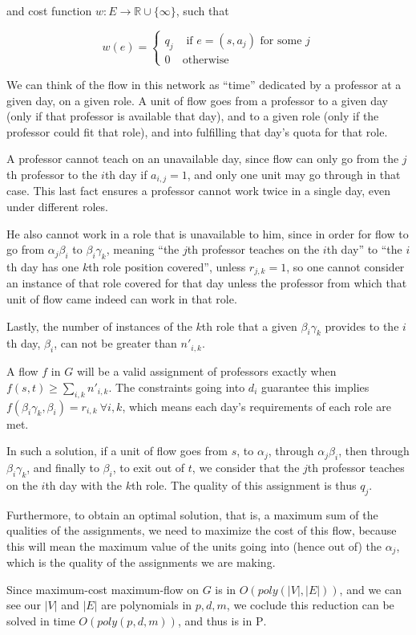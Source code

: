 and cost function $w:E \to \mathbb{R} \cup \{\infty\}$, such that 

$$
w(e) =
\begin{cases}
q_j &\text{ if } e = (s, a_j) \text{ for some }j\\
0 & \text{otherwise}
\end{cases}
$$

We can think of the flow in this network as ``time'' dedicated by a professor at a given day, on a given role. A unit of flow goes from a professor to a given day (only if that professor is available that day), and to a given role (only if the professor could fit that role), and into fulfilling that day's quota for that role.

A professor cannot teach on an unavailable day, since flow can only go from the $j$th professor to the $i$th day if $a_{i, j} = 1$, and only one unit may go through in that case. This last fact ensures a professor cannot work twice in a single day, even under different roles.

He also cannot work in a role that is unavailable to him, since in order for flow to go from $\alpha_j \beta_i$ to $\beta_i \gamma_k$, meaning ``the $j$th professor teaches on the $i$th day'' to ``the $i$th day has one $k$th role position covered'', unless $r_{j, k} = 1$, so one cannot consider an instance of that role covered for that day unless the professor from which that unit of flow came indeed can work in that role.

Lastly, the number of instances of the $k$th role that a given $\beta_i \gamma_k$ provides to the $i$th day, $\beta_i$, can not be greater than $n'_{i, k}$.

A flow $f$ in $G$ will be a valid assignment of professors exactly when $f(s, t) \ge \sum_{i, k} n'_{i, k}$. The constraints going into $d_i$ guarantee this implies $f(\beta_i \gamma_k, \beta_i) = r_{i, k}\ \forall i, k$, which means each day's requirements of each role are met.

In such a solution, if a unit of flow goes from $s$, to $\alpha_j$, through $\alpha_j \beta_i$, then through $\beta_i \gamma_k$, and finally to $\beta_i$, to exit out of $t$, we consider that the $j$th professor teaches on the $i$th day with the $k$th role. The quality of this assignment is thus $q_j$.

Furthermore, to obtain an optimal solution, that is, a maximum sum of the qualities of the assignments, we need to maximize the cost of this flow, because this will mean the maximum value of the units going into (hence out of) the $\alpha_j$, which is the quality of the assignments we are making.

Since maximum-cost maximum-flow on $G$ is in $O(poly(|V|, |E|))$, and we can see our $|V|$ and $|E|$ are polynomials in $p, d, m$, we coclude this reduction can be solved in time $O(poly(p, d, m))$, and thus is in \textsc{P}.
